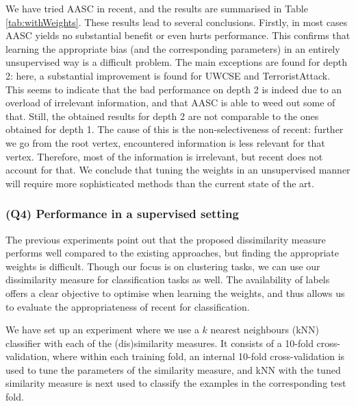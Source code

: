 We have tried AASC in \gls{recent}, and the results  are summarised in Table~ \ref{tab:withWeights}.
These results lead to several conclusions.
Firstly, in most cases AASC yields no substantial benefit or even hurts performance.
This confirms that learning the appropriate bias (and the corresponding parameters) in an entirely unsupervised way is a difficult problem.
The main exceptions are found for depth 2: here, a substantial improvement is found for UWCSE and TerroristAttack.
This seems to indicate that the bad performance on depth 2 is indeed due to an overload of irrelevant information, and that AASC is able to weed out some of that.
Still, the obtained results for depth 2 are not comparable to the ones obtained for depth 1.
The cause of this is the non-selectiveness of \gls{recent}: further we go from the root vertex, encountered information is less relevant for that vertex.
Therefore, most of the information is irrelevant, but \gls{recent} does not account for that.
We conclude that tuning the weights in an unsupervised manner will require more sophisticated methods than the current state of the art.









\subsubsection{\textbf{(Q4) Performance in a supervised setting}}


The previous experiments point out that the proposed dissimilarity measure performs well compared to the existing approaches, but finding the appropriate weights is difficult.
Though our focus is on clustering tasks, we can use our dissimilarity measure for classification tasks as well.
The availability of labels offers a clear objective to optimise when learning the weights, and thus allows us to evaluate the appropriateness of \gls{recent} for classification.

We have set up an experiment where we use a $k$ nearest neighbours (kNN) classifier with each of the (dis)similarity measures.
It consists of a 10-fold cross-validation, where within
each training fold, an internal 10-fold cross-validation is used to tune the parameters of the similarity measure, and kNN with the tuned similarity measure is next used to classify the examples in the corresponding test fold.



